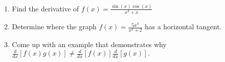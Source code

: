 \documentclass[11pt,fleqn]{article}
\begin{document}
\renewcommand{\headrulewidth}{0pt}
\newcommand{\blank}[1]{\rule{#1}{0.75pt}}
\newcommand{\bc}{\begin{center}}
\newcommand{\ec}{\end{center}}
\renewcommand{\d}{\displaystyle}

\vspace*{-0.7in}

\begin{center}
  \large
  \\
\end{center}
\begin{enumerate}
\item Find the derivative of $f(x)=\frac{\sin(x)\cos(x)}{x^3+x}$
\vfill
\item Determine where the graph $f(x)=\frac{5x^3}{x^2+2}$ has a horizontal tangent.
\vfill
\item Come up with an example that demonstrates why $\frac{d}{dx}\left[ f(x) g(x) \right ] \not= \frac{d}{dx}\left[ f(x)\right] \frac{d}{dx}\left[g(x) \right].$
\vfill

\end{enumerate}
\end{document}
